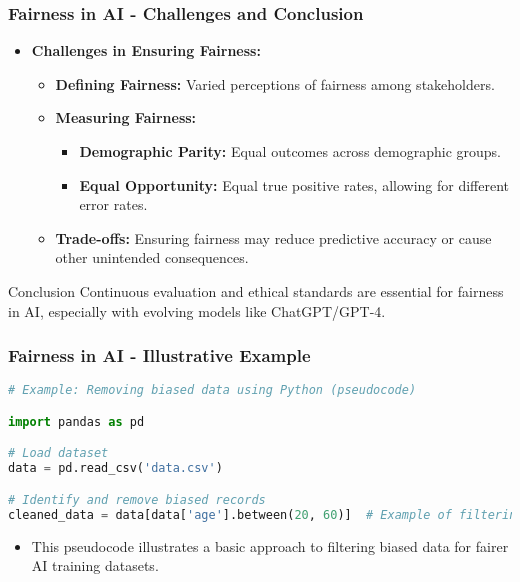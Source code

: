 \documentclass[aspectratio=169]{beamer}
\begin{document}
\begin{frame}[fragile]
    \frametitle{Fairness in AI - Challenges and Conclusion}
    \begin{itemize}
        \item \textbf{Challenges in Ensuring Fairness:}
        \begin{itemize}
            \item \textbf{Defining Fairness:} Varied perceptions of fairness among stakeholders.
            \item \textbf{Measuring Fairness:} 
            \begin{itemize}
                \item \textbf{Demographic Parity:} Equal outcomes across demographic groups.
                \item \textbf{Equal Opportunity:} Equal true positive rates, allowing for different error rates.
            \end{itemize}
            \item \textbf{Trade-offs:} Ensuring fairness may reduce predictive accuracy or cause other unintended consequences.
        \end{itemize}
    \end{itemize}
    
    \begin{block}{Conclusion}
        Continuous evaluation and ethical standards are essential for fairness in AI, especially with evolving models like ChatGPT/GPT-4.
    \end{block}
\end{frame}

\begin{frame}[fragile]
    \frametitle{Fairness in AI - Illustrative Example}
    \begin{lstlisting}[language=Python]
# Example: Removing biased data using Python (pseudocode)

import pandas as pd

# Load dataset
data = pd.read_csv('data.csv')

# Identify and remove biased records
cleaned_data = data[data['age'].between(20, 60)]  # Example of filtering out bias
    \end{lstlisting}
    \begin{itemize}
        \item This pseudocode illustrates a basic approach to filtering biased data for fairer AI training datasets.
    \end{itemize}
\end{frame}
\end{document}
